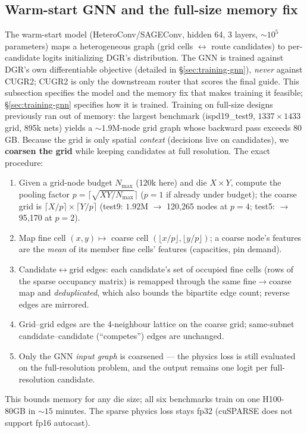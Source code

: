 \documentclass[11pt]{article}
\begin{document}
\subsection{Warm-start GNN and the full-size memory fix}
The warm-start model (HeteroConv/SAGEConv, hidden 64, 3 layers,
${\sim}10^5$ parameters) maps a heterogeneous graph (grid cells
$\leftrightarrow$ route candidates) to per-candidate logits initializing
DGR's distribution. The GNN is trained against DGR's own differentiable
objective (detailed in \S\ref{sec:training-gnn}), \emph{never} against
CUGR2; CUGR2 is only the downstream router that scores the final guide. This
subsection specifies the model and the memory fix that makes training it
feasible; \S\ref{sec:training-gnn} specifies how it is trained.
Training on full-size designs previously ran out of
memory: the largest benchmark (ispd19\_test9, $1337\times1433$ grid, 895k
nets) yields a ${\sim}1.9$M-node grid graph whose backward pass exceeds
80\,GB. Because the grid is only spatial \emph{context} (decisions live on
candidates), we \textbf{coarsen the grid} while keeping candidates at full
resolution. The exact procedure:
\begin{enumerate}\itemsep2pt
\item Given a grid-node budget $N_{\max}$ (120k here) and die $X\times Y$,
  compute the pooling factor $p=\lceil\sqrt{XY/N_{\max}}\rceil$ ($p{=}1$ if
  already under budget); the coarse grid is
  $\lceil X/p\rceil\times\lceil Y/p\rceil$ (test9: $1.92$M
  $\to$ 120{,}265 nodes at $p{=}4$; test5: $\to$ 95{,}170 at $p{=}2$).
\item Map fine cell $(x,y)\mapsto$ coarse cell $(\lfloor x/p\rfloor,
  \lfloor y/p\rfloor)$; a coarse node's features are the \emph{mean} of its
  member fine cells' features (capacities, pin demand).
\item Candidate$\leftrightarrow$grid edges: each candidate's set of occupied
  fine cells (rows of the sparse occupancy matrix) is remapped through the
  same fine$\to$coarse map and \emph{deduplicated}, which also bounds the
  bipartite edge count; reverse edges are mirrored.
\item Grid--grid edges are the 4-neighbour lattice on the coarse grid;
  same-subnet candidate--candidate (``competes'') edges are unchanged.
\item Only the GNN \emph{input graph} is coarsened --- the physics loss is
  still evaluated on the full-resolution problem, and the output remains one
  logit per full-resolution candidate.
\end{enumerate}
This bounds memory for any die size; all six benchmarks train on one
H100-80GB in ${\sim}15$ minutes. The sparse physics loss stays fp32
(cuSPARSE does not support fp16 autocast).
\end{document}

